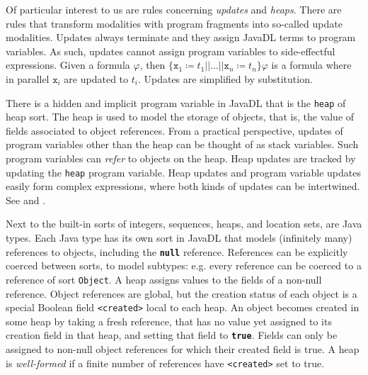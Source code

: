 Of particular interest to us are rules concerning \emph{updates} and \emph{heaps}. There are rules that transform modalities with program fragments into so-called update modalities. Updates always terminate and they assign JavaDL terms to program variables. As such, updates cannot assign program variables to side-effectful expressions. Given a formula $\varphi$, then $\{\mathtt{x}_1\coloneqq t_1||\ldots||\mathtt{x}_n\coloneqq t_n\}\varphi$ is a formula where in parallel $\mathtt{x}_i$ are updated to $t_i$. Updates are simplified by substitution.

There is a hidden and implicit program variable in JavaDL that is the \texttt{heap} of heap sort. The heap is used to model the storage of objects, that is, the value of fields associated to object references. From a practical perspective, updates of program variables other than the heap can be thought of as stack variables. Such program variables can \emph{refer} to objects on the heap. Heap updates are tracked by updating the \texttt{heap} program variable. Heap updates and program variable updates easily form complex expressions, where both kinds of updates can be intertwined. See \cite[Section 2.4.3]{KeYbook} and \cite[Section 6.4]{KeYbook}.

Next to the built-in sorts of integers, sequences, heaps, and location sets, are Java types. Each Java type has its own sort in JavaDL that models (infinitely many) references to objects, including the \texttt{\textbf{null}} reference. References can be explicitly coerced between sorts, to model subtypes: e.g. every reference can be coerced to a reference of sort \texttt{Object}. A heap assigns values to the fields of a non-null reference.
Object references are global, but the creation status of each object is a special Boolean field \texttt{<created>} local to each heap. An object becomes created in some heap by taking a fresh reference, that has no value yet assigned to its creation field in that heap, and setting that field to \texttt{\textbf{true}}. Fields can only be assigned to non-null object references for which their created field is true. A heap is \emph{well-formed} if a finite number of references have \texttt{<created>} set to true.


